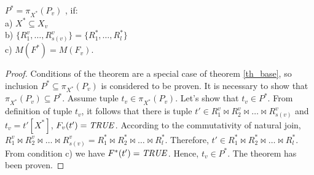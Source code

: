 \begin{theorem}
$P^{\ast} = \pi_{X^{\ast}} (P_{v})$
, if: 
\\a) $X^{\ast} \subseteq X_{v}$
\\b) 
$\{R^{v}_{1}, \ldots, R^{v}_{s(v)}\} = \{R^{\ast}_{1}, \ldots, R^{\ast}_{l}\}$
\\c) $M (F^{\ast}) = M (F_{v}) $.
\label{th_base_eq}
\end{theorem} 
\begin{proof}
Conditions of the theorem are a special case of theorem \ref{th_base}, so
inclusion $P^{\ast} \subseteq \pi_{X^{\ast}} (P_{v})$ is considered  to be
proven. It is necessary to show that $\pi_{X^{\ast}} (P_{v}) \subseteq
P^{\ast}$. Assume tuple $t_v \in \pi_{X^{\ast}} (P_{v})$. Let's show that $t_v
\in P^{\ast}$. From definition of tuple $t_v$, it follows that there is tuple
$t' \in R^v_1 \Join R^v_2\Join\ldots \Join R^v_{s(v)}$ and $t_v = t'[X^{\ast}]$,
$F_v(t')=\mathit{TRUE}$. According to the commutativity of natural join, $R^v_1 \Join
R^v_2\Join\ldots \Join R^v_{s(v)} = R^{\ast}_1 \Join R^{\ast}_2\Join\ldots \Join
R^{\ast}_l$. Therefore, $t' \in R^{\ast}_1 \Join R^{\ast}_2\Join\ldots \Join
R^{\ast}_l$. From condition c) we have $F^{\ast} (t')=\mathit{TRUE}$. Hence, $t_v \in
P^{\ast}$. The theorem has been proven.
\end{proof}
